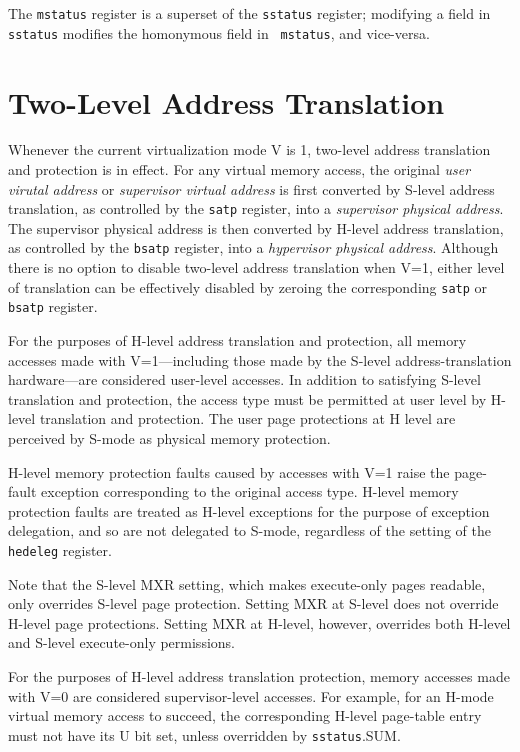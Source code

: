The {\tt mstatus} register is a superset of the {\tt sstatus} register;
modifying a field in {\tt sstatus} modifies the homonymous field in {\tt
mstatus}, and vice-versa.

\section{Two-Level Address Translation}

Whenever the current virtualization mode V is 1, two-level address translation
and protection is in effect.  For any virtual memory access, the original {\em
user virutal address} or {\em supervisor virtual address} is first converted
by S-level address translation, as controlled by the {\tt satp} register, into
a {\em supervisor physical address}.  The supervisor physical address is then
converted by H-level address translation, as controlled by the {\tt bsatp}
register, into a {\em hypervisor physical address}.
Although there is no option to disable two-level address translation when V=1,
either level of translation can be effectively disabled by zeroing the
corresponding {\tt satp} or {\tt bsatp} register.

For the purposes of H-level address translation and protection, all memory
accesses made with V=1---including those made by the S-level
address-translation hardware---are considered user-level accesses.  In
addition to satisfying S-level translation and protection, the access type
must be permitted at user level by H-level translation and protection.
The user page protections at H level are perceived by S-mode as physical
memory protection.

H-level memory protection faults caused by accesses with V=1 raise the
page-fault exception corresponding to the original access type.  H-level
memory protection faults are treated as H-level exceptions for the purpose of
exception delegation, and so are not delegated to S-mode, regardless of the
setting of the {\tt hedeleg} register.

Note that the S-level MXR setting, which makes execute-only pages readable,
only overrides S-level page protection.  Setting MXR at S-level does not override
H-level page protections.  Setting MXR at H-level, however, overrides
both H-level and S-level execute-only permissions.

For the purposes of H-level address translation protection, memory accesses
made with V=0 are considered supervisor-level accesses.  For example, for an
H-mode virtual memory access to succeed, the corresponding H-level page-table
entry must not have its U bit set, unless overridden by {\tt sstatus}.SUM.

